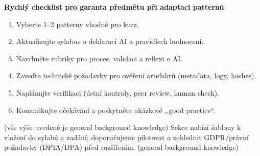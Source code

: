 \medskip
\textbf{Rychlý checklist pro garanta předmětu při adaptaci patternů}
\begin{enumerate}
  \item Vyberte 1–2 patterny vhodné pro kurz.
  \item Aktualizujte sylabus o deklaraci AI a pravidlech hodnocení.
  \item Navrhněte rubriky pro proces, validaci a reflexi o AI.
  \item Zaveďte technické požadavky pro ověření artefaktů (metadata, logy, hashes).
  \item Naplánujte verifikaci (ústní kontroly, peer review, human check).
  \item Komunikujte očekávání a poskytněte ukázkové „good practice“.
\end{enumerate}
(vše výše uvedené je general background knowledge) Sekce nabízí šablony k vložení do sylabů a zadání; doporučujeme pilotovat a zohlednit GDPR/právní požadavky (DPIA/DPA) před rozšířením. (general background knowledge)